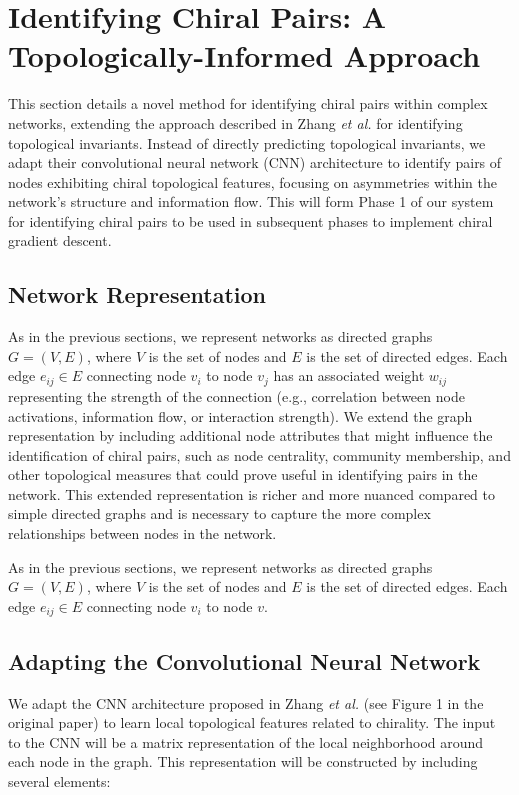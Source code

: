 \documentclass[12pt, a4paper]{article}
\begin{document}
\section{Identifying Chiral Pairs: A Topologically-Informed Approach}

This section details a novel method for identifying chiral pairs within complex networks, extending the approach described in Zhang \textit{et al.} \cite{zhang2018machine} for identifying topological invariants.  Instead of directly predicting topological invariants, we adapt their convolutional neural network (CNN) architecture to identify pairs of nodes exhibiting chiral topological features, focusing on asymmetries within the network's structure and information flow.  This will form Phase 1 of our system for identifying chiral pairs to be used in subsequent phases to implement chiral gradient descent.

\subsection{Network Representation}

As in the previous sections, we represent networks as directed graphs $G = (V, E)$, where $V$ is the set of nodes and $E$ is the set of directed edges. Each edge $e_{ij} \in E$ connecting node $v_i$ to node $v_{j}$ has an associated weight $w_{ij}$ representing the strength of the connection (e.g., correlation between node activations, information flow, or interaction strength). We extend the graph representation by including additional node attributes that might influence the identification of chiral pairs, such as node centrality, community membership, and other topological measures that could prove useful in identifying pairs in the network.  This extended representation is richer and more nuanced compared to simple directed graphs and is necessary to capture the more complex relationships between nodes in the network.

As in the previous sections, we represent networks as directed graphs $G = (V, E)$, where $V$ is the set of nodes and $E$ is the set of directed edges.  Each edge $e_{ij} \in E$ connecting node $v_{i}$ to node $v$.

\subsection{Adapting the Convolutional Neural Network}

We adapt the CNN architecture proposed in Zhang \textit{et al.} \cite{zhang2018machine}  (see Figure 1 in the original paper) to learn local topological features related to chirality. The input to the CNN will be a matrix representation of the local neighborhood around each node in the graph.  This representation will be constructed by including several elements:
\end{document}
